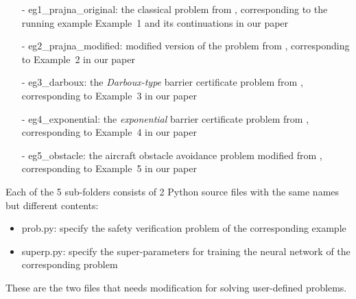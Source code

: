 \documentclass{llncs}
\begin{document}
\begin{itemize}
    \item[-] {\color{blue}\textsf{eg1\_prajna\_original}}: the classical problem from \cite{Prajna04safetyverification}, corresponding to the running example 
    Example~1 and its continuations in our paper
    \item[-] {\color{blue}\textsf{eg2\_prajna\_modified}}: modified version of the problem from \cite{Prajna04safetyverification}, corresponding to Example~2 in our paper 
    \item[-] {\color{blue}\textsf{eg3\_darboux}}: the \emph{Darboux-type} barrier certificate problem from \cite{Zeng2016}, corresponding to Example~3 in our paper
    \item[-] {\color{blue}\textsf{eg4\_exponential}}: the \emph{exponential} barrier certificate problem from \cite{HengjunZhaoFM2015}, corresponding to Example~4
                in our paper 
    \item[-] {\color{blue}\textsf{eg5\_obstacle}}: the aircraft obstacle avoidance problem modified from \cite{BarryICRA2012}, corresponding to Example~5 in our paper
\end{itemize}
Each of the 5 sub-folders consists of 2 Python source files with the same names but different contents:
\begin{itemize}
    \item {\color{purple}\textsf{prob.py}}: specify the safety verification problem of the corresponding example
    \item {\color{purple}\textsf{superp.py}}: specify the super-parameters for training the neural network of the corresponding problem
\end{itemize}
These are the two files that needs modification for solving user-defined problems.
\end{document}
